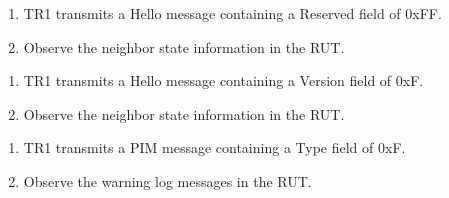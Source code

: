\documentclass[11pt]{report}
\begin{document}

\begin{enumerate}

  \item TR1 transmits a Hello message containing a Reserved field of 0xFF.

  \item Observe the neighbor state information in the RUT.

\end{enumerate}


\begin{enumerate}

  \item TR1 transmits a Hello message containing a Version field of 0xF.

  \item Observe the neighbor state information in the RUT.

\end{enumerate}


\begin{enumerate}

  \item TR1 transmits a PIM message containing a Type field of 0xF.

  \item Observe the warning log messages in the RUT.

\end{enumerate}
\end{document}
